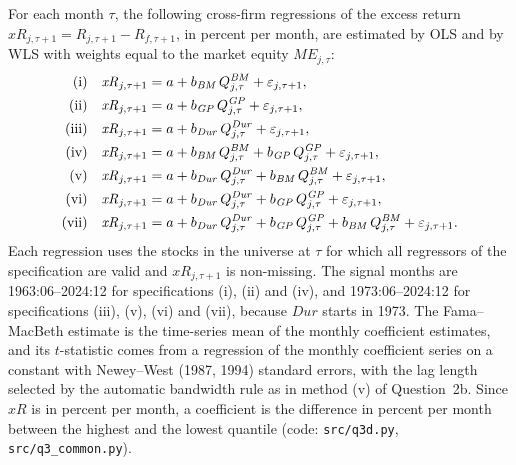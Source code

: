\documentclass[11pt]{article}
\newcommand{\xR}{\mathit{xR}}
\newcommand{\BM}{\mathit{BM}}
\newcommand{\GP}{\mathit{GP}}
\newcommand{\Dur}{\mathit{Dur}}
\begin{document}
For each month $\tau$, the following cross-firm regressions of the excess return
$\xR_{j,\tau+1} = R_{j,\tau+1} - R_{f,\tau+1}$, in percent per month, are estimated by OLS and
by WLS with weights equal to the market equity $\mathit{ME}_{j,\tau}$:
\begin{align}
  \text{(i)}\quad   & \xR_{j,\tau+1} = a + b_{\BM}\, Q^{\BM}_{j,\tau} + \varepsilon_{j,\tau+1}, \notag\\
  \text{(ii)}\quad  & \xR_{j,\tau+1} = a + b_{\GP}\, Q^{\GP}_{j,\tau} + \varepsilon_{j,\tau+1}, \notag\\
  \text{(iii)}\quad & \xR_{j,\tau+1} = a + b_{\Dur}\, Q^{\Dur}_{j,\tau} + \varepsilon_{j,\tau+1}, \notag\\
  \text{(iv)}\quad  & \xR_{j,\tau+1} = a + b_{\BM}\, Q^{\BM}_{j,\tau} + b_{\GP}\, Q^{\GP}_{j,\tau}
                      + \varepsilon_{j,\tau+1}, \label{eq:q3d_regressions}\\
  \text{(v)}\quad   & \xR_{j,\tau+1} = a + b_{\Dur}\, Q^{\Dur}_{j,\tau} + b_{\BM}\, Q^{\BM}_{j,\tau}
                      + \varepsilon_{j,\tau+1}, \notag\\
  \text{(vi)}\quad  & \xR_{j,\tau+1} = a + b_{\Dur}\, Q^{\Dur}_{j,\tau} + b_{\GP}\, Q^{\GP}_{j,\tau}
                      + \varepsilon_{j,\tau+1}, \notag\\
  \text{(vii)}\quad & \xR_{j,\tau+1} = a + b_{\Dur}\, Q^{\Dur}_{j,\tau} + b_{\GP}\, Q^{\GP}_{j,\tau}
                      + b_{\BM}\, Q^{\BM}_{j,\tau} + \varepsilon_{j,\tau+1}. \notag
\end{align}
Each regression uses the stocks in the universe at $\tau$ for which all regressors of the
specification are valid and $\xR_{j,\tau+1}$ is non-missing. The signal months are
1963:06--2024:12 for specifications (i), (ii) and (iv), and 1973:06--2024:12 for
specifications (iii), (v), (vi) and (vii), because $\Dur$ starts in 1973. The Fama--MacBeth
estimate is the time-series mean of the monthly coefficient estimates, and its $t$-statistic
comes from a regression of the monthly coefficient series on a constant with Newey--West
(1987, 1994) standard errors, with the lag length selected by the automatic bandwidth rule
as in method (v) of Question~2b. Since $\xR$ is in percent per month, a coefficient is the
difference in percent per month between the highest and the lowest quantile
(code: \texttt{src/q3d.py}, \texttt{src/q3\_common.py}).

\begin{table}[H]
  \centering
  
  \caption{Fama--MacBeth estimates of regressions (\ref{eq:q3d_regressions}), in percent per
  month, with Newey--West (1987, 1994) $t$-statistics in brackets (between 2 and 16 lags).
  OLS and WLS refer to the monthly cross-firm regressions; the WLS weights are the market
  equity at $\tau$. Avg.\ $N$ is the average number of stocks in the monthly regressions.}
  \label{tab:q3d}
\end{table}
\end{document}
